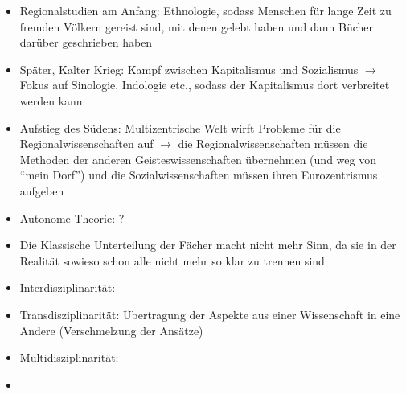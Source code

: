 \documentclass[emulatestandardclasses]{scrartcl}
\begin{document}
\begin{itemize}
  \item Regionalstudien am Anfang: Ethnologie, sodass Menschen für lange Zeit zu fremden Völkern gereist sind, mit denen gelebt haben und dann Bücher darüber geschrieben haben
  \item Später, Kalter Krieg: Kampf zwischen Kapitalismus und Sozialismus $\rightarrow$ Fokus auf Sinologie, Indologie etc., sodass der Kapitalismus dort verbreitet werden kann
  \item Aufstieg des Südens: Multizentrische Welt wirft Probleme für die Regionalwissenschaften auf $\rightarrow$ die Regionalwissenschaften müssen die Methoden der anderen Geisteswissenschaften übernehmen (und weg von "`mein Dorf"') und die Sozialwissenschaften müssen ihren Eurozentrismus aufgeben
  \item Autonome Theorie: ?
  \item Die Klassische Unterteilung der Fächer macht nicht mehr Sinn, da sie in der Realität sowieso schon alle nicht mehr so klar zu trennen sind
  \item Interdisziplinarität:
  \item Transdisziplinarität: Übertragung der Aspekte aus einer Wissenschaft in eine Andere (Verschmelzung der Ansätze)
  \item Multidisziplinarität: 
  \item 
\end{itemize}



\newpage
\end{document}
